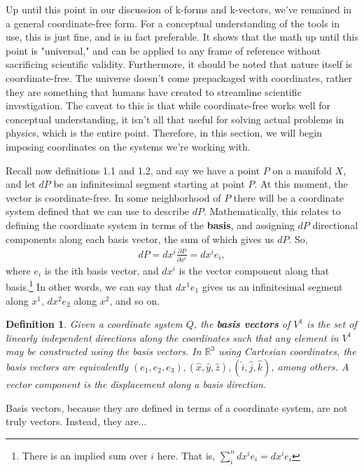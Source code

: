 \documentclass{book}
\newtheorem{defn}[equation]{Definition}
\begin{document}
Up until this point in our discussion of k-forms and k-vectors, we've remained in a general coordinate-free form. For a conceptual understanding of the tools in use, this is just fine, and is in fact preferable. It shows that the math up until this point is "universal," and can be applied to any frame of reference without sacrificing scientific validity. Furthermore, it should be noted that nature itself is coordinate-free. The universe doesn't come prepackaged with coordinates, rather they are something that humans have created to streamline scientific investigation. The caveat to this is that while coordinate-free works well for conceptual understanding, it isn't all that useful for solving actual problems in physics, which is the entire point. Therefore, in this section, we will begin imposing coordinates on the systems we're working with. 


Recall now definitions 1.1 and 1.2, and say we have a point $P$ on a manifold $X$, and let $dP$ be an infinitesimal segment starting at point $P$. At this moment, the vector is coordinate-free. In some neighborhood of $P$ there will be a coordinate system defined that we can use to describe $dP$. Mathematically, this relates to defining the coordinate system in terms of the \textbf{basis}, and assigning $dP$ directional components  along each basis vector, the sum of which gives us $dP$. So, \begin{gather}dP = dx^i \frac{\partial P}{\partial x^i} = dx^i e_i,\end{gather} where $e_i$ is the ith basis vector, and $dx^i$ is the vector component along that basis.\footnote{There is an implied sum over $i$ here. That is, $\sum_i^n dx^i e_i = dx^i e_i$} In other words, we can say that $dx^1e_1$ gives us an infinitesimal segment along $x^1$, $dx^2e_2$ along $x^2$, and so on. 


\begin{defn}
	Given a coordinate system $Q$, the \textbf{basis vectors} of $V^1$ is the set of linearly independent directions along the coordinates such that any element in $V^1$ may be constructed using the basis vectors. In $\mathbb{R}^3$ using Cartesian coordinates, the basis vectors are equivalently $(e_1, e_2, e_3), (\hat{x}, \hat{y}, \hat{z}), (\hat{i}, \hat{j}, \hat{k})$, among others. A vector component is the displacement along a basis direction.
\end{defn}
Basis vectors, because they are defined in terms of a coordinate system, are not truly vectors. Instead, they are...
\end{document}
